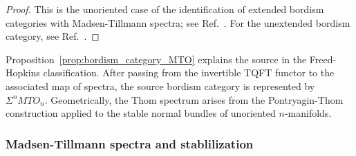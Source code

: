 \documentclass[aps,prx,reprint,superscriptaddress,twocolumn,amsmath,amssymb,amsfonts, nofootinbib]{revtex4-2}
\theoremstyle{apsstyle}
\begin{document}
\begin{proof}
This is the unoriented case of the identification of extended bordism categories with Madsen-Tillmann spectra; see Ref.~\cite{SchommerPries2017}. For the unextended bordism category, see Ref.~\cite{MTW2010}.
\end{proof}

\noindent Proposition~\ref{prop:bordism_category_MTO} explains the source in the
Freed-Hopkins classification. After passing from the invertible TQFT
functor to the associated map of spectra, the source bordism category
is represented by $\Sigma^nMTO_n$. Geometrically, the Thom spectrum
arises from the Pontryagin-Thom construction applied to the stable
normal bundles of unoriented $n$-manifolds.

\subsubsection{Madsen-Tillmann spectra and stablilization}
\label{sec:cob_MTO_stability}
\end{document}
